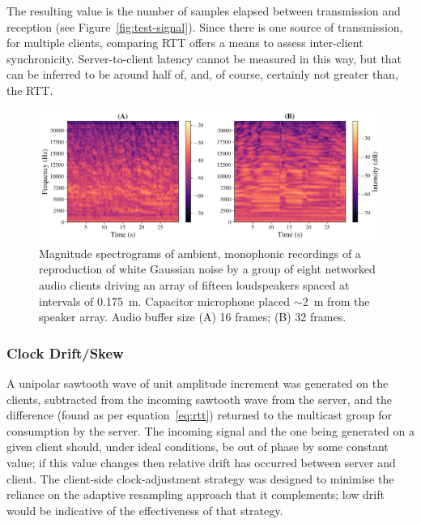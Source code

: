 \documentclass[utf8]{FrontiersinHarvard}
\newcommand{\figref}[1]{Figure~\ref{#1}}
\begin{document}
    The resulting value is the number of samples elapsed between transmission and
    reception (see \figref{fig:test-signal}).
    Since there is one source of transmission, for multiple clients, comparing RTT
    offers a means to assess inter-client synchronicity.
    Server-to-client latency cannot be measured in this way, but that can be
    inferred to be around half of, and, of course, certainly not greater than, the
    RTT.\

    \begin{figure}[h]
        \centering
        \includegraphics[width=\textwidth]{figures/wgn_specgram_16_32}
        \caption{
            Magnitude spectrograms of ambient, monophonic recordings of a
            reproduction of white Gaussian noise by a group of eight networked
            audio clients driving an array of fifteen loudspeakers spaced at
            intervals of \qty{.175}{\m}.
            Capacitor microphone placed $\sim$\qty{2}{\m} from the
            speaker array.
            Audio buffer size (A) 16 frames; (B) 32 frames.
        }
        \label{fig:spectrograms}
    \end{figure}

    \subsubsection{Clock Drift/Skew}
    A unipolar sawtooth wave of unit amplitude increment was generated on the
    clients, subtracted from the incoming sawtooth wave from the server, and the
    difference (found as per equation~\eqref{eq:rtt}) returned to the multicast
    group for consumption by the server.
    The incoming signal and the one being generated on a given client should, under
    ideal conditions, be out of phase by some constant value;
    if this value changes then relative drift has occurred between server and
    client.
    The client-side clock-adjustment strategy was designed to minimise the reliance
    on the adaptive resampling approach that it complements;
    low drift would be indicative of the effectiveness of that strategy.
\end{document}
